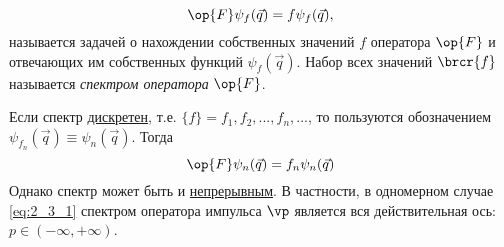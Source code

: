 \begin{equation}
\label{eq:2_3_2}
\op{F}\psi_f(\vec{q}) = f \psi_f(\vec{q}), 
\end{equation}%
%
называется задачей о нахождении собственных значений $f$ оператора $\op{F}$ и отвечающих им собственных функций $\psi_f(\vec{q})$. Набор всех значений $\brcr{f}$ называется {\em спектром оператора} $\op{F}$.

Если спектр \underline{дискретен}, т.е. $\{f\} = f_1,f_2,...,f_n,... $, то пользуются обозначением $\psi_{f_n}(\vec{q}) \equiv \psi_n(\vec{q})$. Тогда%
%
\begin{equation}
\label{eq:2_3_3}
\op{F} \psi_n(\vec{q}) = f_n \psi_n(\vec{q})
\end{equation}%
%
Однако спектр может быть и \underline{непрерывным}. В частности, в одномерном случае \eqref{eq:2_3_1} спектром оператора импульса $\vp$ является вся действительная ось: $p \in (-\infty, +\infty)$.